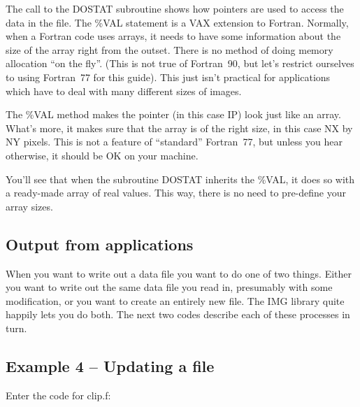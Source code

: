 \documentclass[11pt,nolof]{starlink}
\begin{document}
The call to the \textsf{DOSTAT} subroutine shows how pointers are used to
access the data in the file. The \textsf{{\%VAL}} statement is a VAX
extension to Fortran.  Normally, when a Fortran code uses arrays, it needs
to have some information about the size of the array right from the outset.
There is no method of doing memory allocation ``on the fly''. (This is not
true of Fortran~90, but let's restrict ourselves to using Fortran~77 for
this guide). This just isn't practical for applications which have to deal
with many different sizes of images.

The \textsf{\%VAL} method makes the pointer (in this case \textsf{IP}) look
just like an array. What's more, it makes sure that the array is of the
right size, in this case \textsf{NX} by \textsf{NY} pixels. This is not a
feature of ``standard'' Fortran~77, but unless you hear otherwise, it
should be OK on your machine.

You'll see that when the subroutine \textsf{DOSTAT} inherits the
\textsf{\%VAL}, it does so with a ready-made array of real values. This way,
there is no need to pre-define your array sizes.

\subsection{Output from applications}

When you want to write out a data file you want to do one of two things.
Either you want to write out the same data file you read in, presumably
with some modification, or you want to create an entirely new file.
The IMG library quite happily lets you do both. The next two codes
describe each of these processes in turn.

\subsection{Example 4 -- Updating a file}

Enter the code for \textsf{clip.f}:
\end{document}
